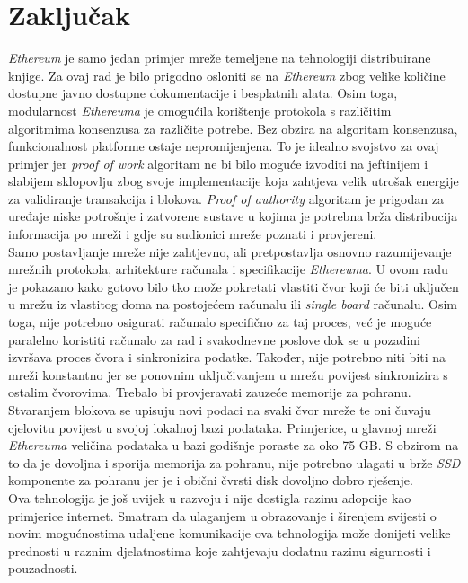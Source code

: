 \documentclass[times, utf8, zavrsni, numeric]{fer}
\begin{document}
\chapter{Zaključak}
\emph{Ethereum} je samo jedan primjer mreže temeljene na tehnologiji distribuirane knjige. Za ovaj rad je bilo prigodno osloniti se na \emph{Ethereum} zbog 
velike količine dostupne javno dostupne dokumentacije i besplatnih alata. Osim toga, modularnost \emph{Ethereuma} je omogućila korištenje protokola s različitim
algoritmima konsenzusa za različite potrebe. Bez obzira na algoritam konsenzusa, funkcionalnost platforme ostaje nepromijenjena.
To je idealno svojstvo za ovaj primjer jer \emph{proof of work} algoritam ne bi bilo moguće izvoditi na jeftinijem i slabijem sklopovlju zbog svoje implementacije
koja zahtjeva velik utrošak energije za validiranje transakcija i blokova. \emph{Proof of authority}
algoritam je prigodan za uređaje niske potrošnje i zatvorene sustave u kojima je potrebna brža distribucija informacija po mreži i gdje su sudionici mreže poznati i 
provjereni. \\
Samo postavljanje mreže nije zahtjevno, ali pretpostavlja osnovno razumijevanje mrežnih protokola, arhitekture računala i specifikacije \emph{Ethereuma}. 
U ovom radu je pokazano kako gotovo bilo tko može pokretati vlastiti čvor koji će biti uključen u mrežu iz vlastitog doma na postojećem računalu ili 
\emph{single board} računalu. Osim toga, nije potrebno osigurati računalo specifično za taj proces, već je moguće paralelno koristiti računalo za rad i svakodnevne poslove
dok se u pozadini izvršava proces čvora i sinkronizira podatke. Također, nije potrebno niti biti na mreži konstantno jer se ponovnim uključivanjem u mrežu povijest
sinkronizira s ostalim čvorovima. Trebalo bi provjeravati zauzeće memorije za pohranu. Stvaranjem blokova se 
upisuju novi podaci na svaki čvor mreže te oni čuvaju cjelovitu povijest u svojoj lokalnoj bazi podataka. Primjerice, u glavnoj mreži \emph{Ethereuma} veličina
podataka u bazi godišnje poraste za oko 75 GB. S obzirom na to da je dovoljna i sporija memorija za pohranu, nije potrebno ulagati u brže \emph{SSD} komponente za pohranu jer
je i obični čvrsti disk dovoljno dobro rješenje. \\
Ova tehnologija je još uvijek u razvoju i nije dostigla razinu adopcije kao primjerice internet. Smatram da ulaganjem u obrazovanje i širenjem svijesti o novim mogućnostima
udaljene komunikacije ova tehnologija može donijeti velike prednosti u raznim djelatnostima koje zahtjevaju dodatnu razinu sigurnosti i pouzadnosti. 
\end{document}
